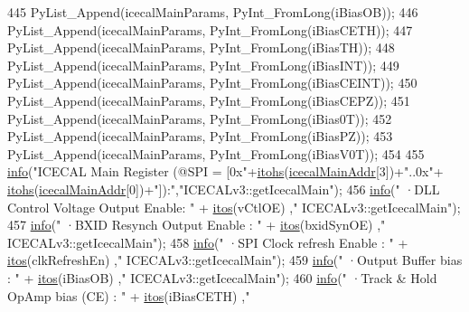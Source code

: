 \begin{DoxyCode}
445         PyList\_Append(icecalMainParams, PyInt\_FromLong(iBiasOB));
446         PyList\_Append(icecalMainParams, PyInt\_FromLong(iBiasCETH));
447         PyList\_Append(icecalMainParams, PyInt\_FromLong(iBiasTH));
448         PyList\_Append(icecalMainParams, PyInt\_FromLong(iBiasINT));
449         PyList\_Append(icecalMainParams, PyInt\_FromLong(iBiasCEINT));
450         PyList\_Append(icecalMainParams, PyInt\_FromLong(iBiasCEPZ));
451         PyList\_Append(icecalMainParams, PyInt\_FromLong(iBias0T));
452         PyList\_Append(icecalMainParams, PyInt\_FromLong(iBiasPZ));
453         PyList\_Append(icecalMainParams, PyInt\_FromLong(iBiasV0T));
454 
455         \hyperlink{classObject_a644fd329ea4cb85f54fa6846484b84a8}{info}(\textcolor{stringliteral}{"ICECAL Main Register (@SPI = [0x"}+\hyperlink{classICECALv3_a04b02e583f191bfce34d05132cd23834}{itohs}(\hyperlink{ICECALv3_8h_a9c22ae782814495416dc2b803df326c1}{icecalMainAddr}[3])+\textcolor{stringliteral}{"..0x"}+
      \hyperlink{classICECALv3_a04b02e583f191bfce34d05132cd23834}{itohs}(\hyperlink{ICECALv3_8h_a9c22ae782814495416dc2b803df326c1}{icecalMainAddr}[0])+\textcolor{stringliteral}{"]):"},\textcolor{stringliteral}{"ICECALv3::getIcecalMain"});
456         \hyperlink{classObject_a644fd329ea4cb85f54fa6846484b84a8}{info}(\textcolor{stringliteral}{"   ·DLL Control Voltage Output Enable: "} + \hyperlink{Tools_8h_af330027dbdafb9a30768b3613c553e60}{itos}(vCtlOE)               ,\textcolor{stringliteral}{"
      ICECALv3::getIcecalMain"});
457         \hyperlink{classObject_a644fd329ea4cb85f54fa6846484b84a8}{info}(\textcolor{stringliteral}{"   ·BXID Resynch Output Enable       : "} + \hyperlink{Tools_8h_af330027dbdafb9a30768b3613c553e60}{itos}(bxidSynOE)        ,\textcolor{stringliteral}{"
      ICECALv3::getIcecalMain"});
458         \hyperlink{classObject_a644fd329ea4cb85f54fa6846484b84a8}{info}(\textcolor{stringliteral}{"   ·SPI Clock refresh Enable         : "} + \hyperlink{Tools_8h_af330027dbdafb9a30768b3613c553e60}{itos}(clkRefreshEn) ,\textcolor{stringliteral}{"
      ICECALv3::getIcecalMain"});
459         \hyperlink{classObject_a644fd329ea4cb85f54fa6846484b84a8}{info}(\textcolor{stringliteral}{"   ·Output Buffer bias               : "} + \hyperlink{Tools_8h_af330027dbdafb9a30768b3613c553e60}{itos}(iBiasOB)          ,\textcolor{stringliteral}{"
      ICECALv3::getIcecalMain"});
460         \hyperlink{classObject_a644fd329ea4cb85f54fa6846484b84a8}{info}(\textcolor{stringliteral}{"   ·Track & Hold OpAmp bias (CE)     : "} + \hyperlink{Tools_8h_af330027dbdafb9a30768b3613c553e60}{itos}(iBiasCETH)        ,\textcolor{stringliteral}{"
}
\end{DoxyCode}
